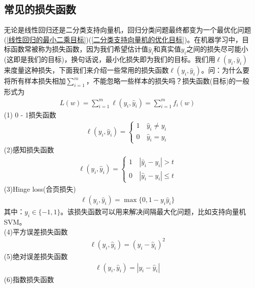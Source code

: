     \subsection{常见的损失函数}
        \par
        无论是线性回归还是二分类支持向量机，回归分类问题最终都变为一个最优化问题(\ref{线性回归的最小二乘目标})(\ref{二分类支持向量机的优化目标})。在机器学习中，目标函数常被称为损失函数，因为我们希望估计值$\hat{y}_i$和真实值$y_i$之间的损失尽可能小(这即是我们的目标)，换句话说，最小化损失即为我们的目标。我们用$\ell(y_i,\hat{y}_i)$来度量这种损失，下面我们来介绍一些常用的损失函数$\ell(y_i,\hat{y}_i)$。问：为什么要将所有样本损失相加$\sum_{i=1}^m$，不能忽略一些样本的损失吗？损失函数(目标)的一般形式为
        \begin{align*}
        L(w) = \sum_{i=1}^m \ell(y_i,\hat{y}_i) = \sum_{i=1}^mf_i(w)
        \end{align*}
        (1) 0 - 1损失函数
        \begin{align*}
        \ell(y_i,\hat{y}_i) =
        \left\{
        \begin{aligned}
        1 \quad \hat{y}_i \neq y_i\\
        0 \quad \hat{y}_i = y_i
        \end{aligned}
        \right.
        \end{align*}
        (2)感知损失函数
        \begin{align*}
        \ell(y_i,\hat{y}_i) =
        \left\{
        \begin{aligned}
        1 \quad |\hat{y}_i - y_i| > t\\
        0 \quad |\hat{y}_i - y_i| \leqslant t
        \end{aligned}
        \right.
        \end{align*}
        (3)Hinge loss(合页损失)
        \begin{align*}
        \ell(y_i,\hat{y}_i) = \max \{0,1-y_i\hat{y}_i\}
        \end{align*}
        其中：$y_i\in \{-1,1\}$。该损失函数可以用来解决间隔最大化问题，比如支持向量机SVM。\\
        (4)平方误差损失函数
        \begin{align*}
        \ell(y_i,\hat{y}_i) = (y_i-\hat{y}_i)^2
        \end{align*}
        (5)绝对误差损失函数
        \begin{align*}
        \ell(y_i,\hat{y}_i) = |y_i-\hat{y}_i|
        \end{align*}
        (6)指数损失函数
